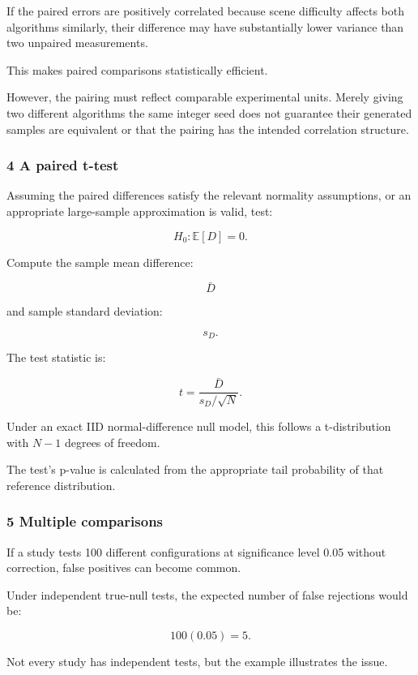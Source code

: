 If the paired errors are positively correlated because scene difficulty affects both algorithms similarly, their difference may have substantially lower variance than two unpaired measurements.

This makes paired comparisons statistically efficient.

However, the pairing must reflect comparable experimental units. Merely giving two different algorithms the same integer seed does not guarantee their generated samples are equivalent or that the pairing has the intended correlation structure.

\subsubsection{4 A paired t-test}\label{02-foundations-ii-ch030-a-paired-t-test}

Assuming the paired differences satisfy the relevant normality assumptions, or an appropriate large-sample approximation is valid, test:

\[
 H_0:\mathbb E[D]=0.
\]

Compute the sample mean difference:

\[
 \bar D
\]

and sample standard deviation:

\[
 s_D.
\]

The test statistic is:

\[
 \boxed{ t= \frac{\bar D}{s_D/\sqrt N} }.
\]

Under an exact IID normal-difference null model, this follows a t-distribution with \(N-1\) degrees of freedom.

The test's p-value is calculated from the appropriate tail probability of that reference distribution.

\subsubsection{5 Multiple comparisons}\label{02-foundations-ii-ch030-multiple-comparisons}

If a study tests 100 different configurations at significance level 0.05 without correction, false positives can become common.

Under independent true-null tests, the expected number of false rejections would be:

\[
 100(0.05)=5.
\]

Not every study has independent tests, but the example illustrates the issue.

